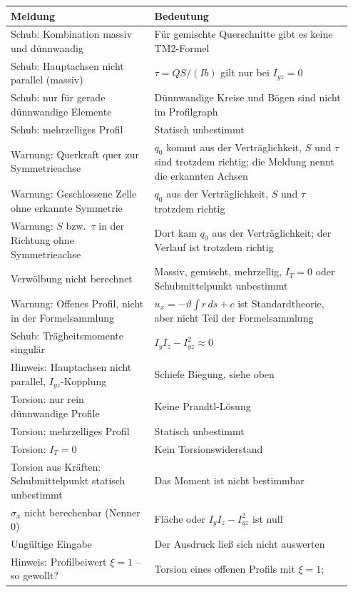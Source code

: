 \begin{longtable}{p{0.40\linewidth}p{0.55\linewidth}}
  \toprule
  \textbf{Meldung} & \textbf{Bedeutung} \\
  \midrule \endhead
  Schub: Kombination massiv und dünnwandig & Für gemischte Querschnitte gibt es keine TM2-Formel \\
  Schub: Hauptachsen nicht parallel (massiv) & $\tau = QS/(Ib)$ gilt nur bei $I_{yz} = 0$ \\
  Schub: nur für gerade dünnwandige Elemente & Dünnwandige Kreise und Bögen sind nicht im
    Profilgraph \\
  Schub: mehrzelliges Profil & Statisch unbestimmt \\
  Warnung: Querkraft quer zur Symmetrieachse & $q_0$ kommt aus der Verträglichkeit, $S$ und
    $\tau$ sind trotzdem richtig; die Meldung nennt die erkannten Achsen \\
  Warnung: Geschlossene Zelle ohne erkannte Symmetrie & $q_0$ aus der Verträglichkeit, $S$ und
    $\tau$ trotzdem richtig \\
  Warnung: $S$ bzw.\ $\tau$ in der Richtung ohne Symmetrieachse & Dort kam $q_0$ aus der
    Verträglichkeit; der Verlauf ist trotzdem richtig \\
  Verwölbung nicht berechnet & Massiv, gemischt, mehrzellig, $I_T = 0$ oder Schubmittelpunkt
    unbestimmt \\
  Warnung: Offenes Profil, nicht in der Formelsammlung & $u_x = -\vartheta\int r\,ds + c$ ist
    Standardtheorie, aber nicht Teil der Formelsammlung \\
  Schub: Trägheitsmomente singulär & $I_yI_z - I_{yz}^2 \approx 0$ \\
  Hinweis: Hauptachsen nicht parallel, $I_{yz}$-Kopplung & Schiefe Biegung, siehe oben \\
  Torsion: nur rein dünnwandige Profile & Keine Prandtl-Lösung \\
  Torsion: mehrzelliges Profil & Statisch unbestimmt \\
  Torsion: $I_T = 0$ & Kein Torsionswiderstand \\
  Torsion aus Kräften: Schubmittelpunkt statisch unbestimmt & Das Moment ist nicht bestimmbar \\
  $\sigma_x$ nicht berechenbar (Nenner 0) & Fläche oder $I_yI_z - I_{yz}^2$ ist null \\
  Ungültige Eingabe & Der Ausdruck ließ sich nicht auswerten \\
  Hinweis: Profilbeiwert $\xi = 1$ -- so gewollt? & Torsion eines offenen Profils mit $\xi = 1$;

\end{longtable}

